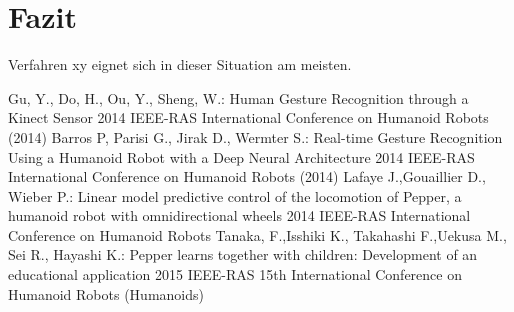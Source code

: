 \documentclass{llncs}
\begin{document}
\section{Fazit}
Verfahren xy eignet sich in dieser Situation am meisten.
\newpage
\begin{thebibliography}{[MT1]}
Gu, Y., Do, H., Ou, Y., Sheng, W.:
Human Gesture Recognition through a Kinect Sensor
2014 IEEE-RAS International Conference on Humanoid Robots (2014)
Barros P, Parisi G., Jirak D., Wermter S.:
Real-time Gesture Recognition Using a Humanoid Robot with a Deep Neural Architecture 2014 IEEE-RAS International Conference on Humanoid Robots (2014)
Lafaye J.,Gouaillier D., Wieber P.:
Linear model predictive control of the locomotion of Pepper, a humanoid robot with omnidirectional wheels 2014 IEEE-RAS International Conference on Humanoid Robots
Tanaka, F.,Isshiki K., Takahashi F.,Uekusa M., Sei R., Hayashi K.:
Pepper learns together with children: Development of an educational application 2015 IEEE-RAS 15th International Conference on Humanoid Robots (Humanoids)
\end{thebibliography}
\end{document}
